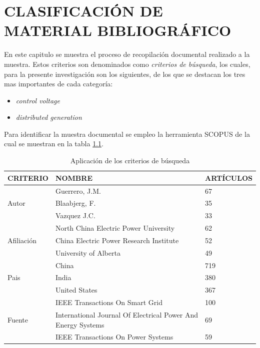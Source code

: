 \documentclass[12pt, letterpaper]{report}
\begin{document}
\chapter{CLASIFICACIÓN DE MATERIAL BIBLIOGRÁFICO}
En este capitulo se muestra el proceso de recopilación documental realizado a  la muestra. Estos criterios son denominados como \textit{criterios de búsqueda}, los cuales,  para la presente investigación son los siguientes,  de los que se destacan los tres mas importantes de cada categoría:\\
 \begin{itemize} 
    \item \textit{control voltage}
    \item \textit{distributed generation}
 \end{itemize} 
Para identificar la muestra documental se empleo la herramienta SCOPUS  de la cual se muestran en la tabla \ref{tab:criterios_busqueda }.
\begin{table}
    \caption{Aplicación de los criterios de búsqueda}
    \label{tab:criterios_busqueda }
\begin{tabular}{|l| p{8 cm}| m{2.8cm} |}
    \hline
    CRITERIO & NOMBRE &  ARTÍCULOS \\\hline
    \multirow{3}{4cm}{Autor} & Guerrero, J.M. & 67\\\cline{2-3}
    & Blaabjerg, F. & 35 \\\cline{2-3}
    & Vazquez J.C.  & 33 \\\hline
    \multirow{3}{4 cm}{Afiliación} & North China Electric Power University & 62 \\\cline{2-3}
    & China Electric Power Research Institute & 52\\\cline{2-3}
    & University of Alberta & 49 \\\hline
    \multirow{3}{4 cm}{Pais} & China & 719 \\\cline{2-3}
    &India &380 \\\cline{2-3}
    & United States & 367 \\\hline
    \multirow{3}{4 cm}{Fuente} & IEEE Transactions On Smart Grid & 100 \\\cline{2-3}
    &International Journal Of Electrical Power And Energy Systems &69 \\\cline{2-3}
    &IEEE Transactions On Power Systems &59 \\\hline

\end{tabular} 
\end{table}
\end{document}
